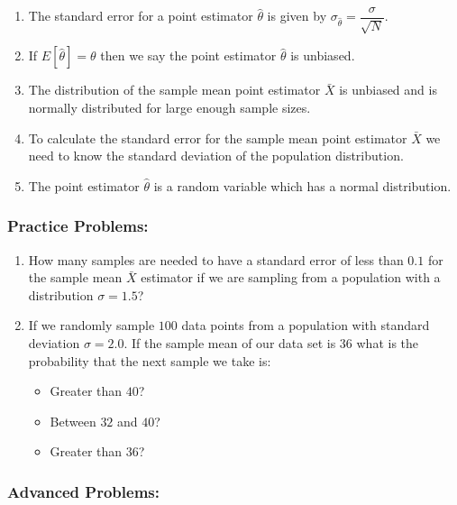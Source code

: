 \documentclass[
]{book}
\providecommand{\tightlist}{%
  \setlength{\itemsep}{0pt}\setlength{\parskip}{0pt}}
\theoremstyle{definition}
\theoremstyle{definition}
\theoremstyle{definition}
\theoremstyle{definition}
\theoremstyle{remark}
\begin{document}
\begin{enumerate}
\def\labelenumi{\arabic{enumi}.}
\tightlist
\item
  The standard error for a point estimator \(\hat{\theta}\) is given by \(\sigma_{\hat{\theta}}=\dfrac{\sigma}{\sqrt{N}}\).
\item
  If \(E[\hat{\theta}]=\theta\) then we say the point estimator \(\hat{\theta}\) is unbiased.
\item
  The distribution of the sample mean point estimator \(\bar{X}\) is unbiased and is normally distributed for large enough sample sizes.
\item
  To calculate the standard error for the sample mean point estimator \(\bar{X}\) we need to know the standard deviation of the population distribution.
\item
  The point estimator \(\hat{\theta}\) is a random variable which has a normal distribution.
\end{enumerate}

\hypertarget{practice-problems-7}{%
\subsubsection{Practice Problems:}\label{practice-problems-7}}

\begin{enumerate}
\def\labelenumi{\arabic{enumi}.}
\tightlist
\item
  How many samples are needed to have a standard error of less than \(0.1\) for the sample mean \(\bar{X}\) estimator if we are sampling from a population with a distribution \(\sigma=1.5\)?
\item
  If we randomly sample \(100\) data points from a population with standard deviation \(\sigma=2.0\). If the sample mean of our data set is \(36\) what is the probability that the next sample we take is:

  \begin{itemize}
  \tightlist
  \item
    Greater than \(40\)?
  \item
    Between \(32\) and \(40\)?
  \item
    Greater than \(36\)?
  \end{itemize}
\end{enumerate}

\hypertarget{advanced-problems-7}{%
\subsubsection{Advanced Problems:}\label{advanced-problems-7}}
\end{document}
